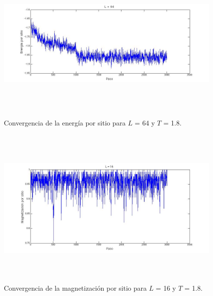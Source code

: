 \documentclass[a4paper,12pt]{article}
\begin{document}
\begin{figure}[H]
\begin{center}
\includegraphics[height=8cm,width=20cm]{../graficos/En_L64_T18.jpg}
\caption[width=5cm]{Convergencia de la energ\'ia por sitio para $L$ = 64 y $T$ = 1.8.}
\end{center}
\end{figure}

\begin{figure}[H]
\begin{center}
\includegraphics[height=8cm]{../graficos/Mag_L16_T18.jpg}
\caption[width=5cm]{Convergencia de la magnetizaci\'on por sitio para $L$ = 16 y $T$ = 1.8.}
\end{center}
\end{figure}
\end{document}
